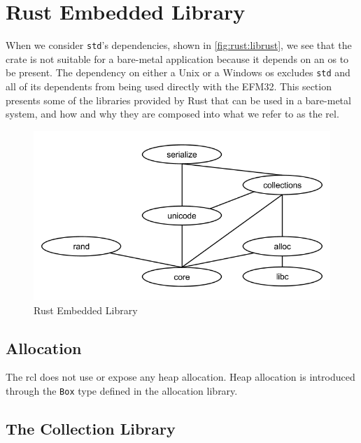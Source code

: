 \section{Rust Embedded Library}
\label{sec:rust_embedded_library}

When we consider \texttt{std}'s dependencies, shown in \autoref{fig:rust:librust}, we see that the crate is not suitable for a bare-metal application because it depends on an \gls{os} to be present.
The dependency on either a Unix or a Windows \gls{os} excludes \texttt{std} and all of its dependents from being used directly with the EFM32.
This section presents some of the libraries provided by Rust that can be used in a bare-metal system, and how and why they are composed into what we refer to as the \gls{rel}.

\begin{figure}[H]
  \begin{center}
    \includegraphics[scale=0.3]{figures/background/rust/embedded-rust-lib.png}
  \end{center}
  \caption{Rust Embedded Library}
  \label{fig:rust:rel}
\end{figure}

\subsection{Allocation}
\label{sec:rust:allocation}

The \gls{rcl} does not use or expose any heap allocation.
Heap allocation is introduced through the \texttt{Box} type defined in the allocation library.

\subsection{The Collection Library}

